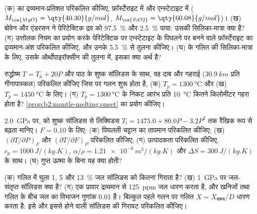 \begin{exercise}[$\star\star$]\label{exo:b2:mantle-melting:6}
(क)  का द्रव्यमान-प्रतिशत परिकलित कीजिए, फ़ॉर्स्टेराइट  में और
एन्स्टेटाइट  में ($M_{\ce{MgO}} = \qty{40.30}{g/mol}$, $M_{\ce{SiO2}} =
\qty{60.08}{g/mol}$)। (ख) बोवेन और एंडरसन ने पेरिटेक्टिक द्रव को
\qty{97.5}{\percent}  और \qty{2.5}{\percent}  पाया: उसकी
सिलिका-मात्रा क्या है? (ग) उत्तोलक नियम का प्रयोग करके पेरिटेक्टिक पर एन्स्टेटाइट के पिघलने पर
बनने वाले फ़ॉर्स्टेराइट का द्रव्यमान-अंश परिकलित कीजिए, और उनके
\qty{5.5}{\percent} से तुलना कीजिए। (घ)  के गलित की सिलिका-मात्रा के लिए, उसके
ऑर्थोपाइरॉक्सीन की तुलना में, इसका क्या अर्थ है?
\end{exercise}

\begin{exercise}[$\star\star$]\label{exo:b2:mantle-melting:7}
रुद्धोष्म $T = T_p + 20P$ और पाठ के शुष्क सॉलिडस के साथ, वह
दाब और गहराई ($\qty{30.9}{km}$ प्रति गीगापास्कल) परिकलित कीजिए जिस पर गलन शुरू होता है,
(क) $T_p = \qty{1300}{\celsius}$ और (ख) $T_p = \qty{1450}{\celsius}$ के लिए। (ग)
$T_p = \qty{1300}{\celsius}$ के निकट आरंभ प्रति \qty{10}{\celsius} कितने किलोमीटर
गहरा होता है? \cref{prop:b2:mantle-melting:onset} का प्रयोग कीजिए।
\end{exercise}

\begin{exercise}[$\star\star$]\label{exo:b2:mantle-melting:8}
\qty{2.0}{GPa} पर,  को शुष्क सॉलिडस से
 लिक्विडस $T_{\mathrm l} = 1475.0 + 80.0P - 3.2P^2$ तक रैखिक रूप से बढ़ता मानिए। $F = 0.10$ के लिए:
(क) पिघलती चट्टान का तापमान परिकलित कीजिए; (ख) $(\partial
T/\partial P)_F$ और $(\partial T/\partial F)_P$ परिकलित कीजिए; (ग) उत्पादकता परिकलित कीजिए,
$c_p = \qty{1000}{J/(kg.K)}$, $\alpha/\rho = \qty{1.21e-8}{m^3/(kg.K)}$ और
$\Delta S = \qty{300}{J/(kg.K)}$ के साथ। (घ) गुप्त ऊष्मा के बिना यह क्या होती?
\end{exercise}

\begin{exercise}[$\star\star$]\label{exo:b2:mantle-melting:9}
(क) गलित में घुला 1, 5 और \qty{13}{\percent} जल सॉलिडस को कितना
गिराता है? (ख) \qty{1}{GPa} पर जल-संतृप्त सॉलिडस क्या है? (ग) एक प्रावार
द्रव्यमान से \qty{125}{ppm} जल धारण करता है, और खनिजों तथा गलित के बीच जल का
विभाजन गुणांक 0.01 है। बिल्कुल पहले गलन पर गलित $X =
X_{\text{समग्र}}/D$ धारण करता है: इसे और इससे होने वाली सॉलिडस की गिरावट परिकलित कीजिए।
\end{exercise}

